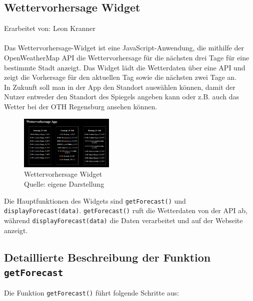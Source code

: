 \subsection{Wettervorhersage Widget}
Erarbeitet von: Leon Kranner \\ \\

\noindent
Das Wettervorhersage-Widget ist eine JavaScript-Anwendung, die mithilfe der OpenWeatherMap API die Wettervorhersage für die nächsten drei Tage für eine bestimmte Stadt anzeigt. Das Widget lädt die Wetterdaten über eine API und zeigt die Vorhersage für den aktuellen Tag sowie die nächsten zwei Tage an. \\
In Zukunft soll man in der App den Standort auswählen können, damit der Nutzer entweder den Standort des Spiegels angeben kann oder z.B. auch das Wetter bei der OTH Regensburg ansehen können.

\begin{figure}[h]
    \centering
    \includegraphics[width=0.4\textwidth]{pictures/forecast_widget.png}
  \captionsetup{justification=centering, labelformat=simple, singlelinecheck=false}
    \caption[Wettervorhersage Widget]{Wettervorhersage Widget\\ Quelle: eigene Darstellung}
\end{figure}

\noindent
Die Hauptfunktionen des Widgets sind \texttt{getForecast()} und \texttt{displayForecast(data)}. \texttt{getForecast()} ruft die Wetterdaten von der API ab, während \texttt{displayForecast(data)} die Daten verarbeitet und auf der Webseite anzeigt.

\subsection*{Detaillierte Beschreibung der Funktion \texttt{getForecast}}
Die Funktion \texttt{getForecast()} führt folgende Schritte aus:

